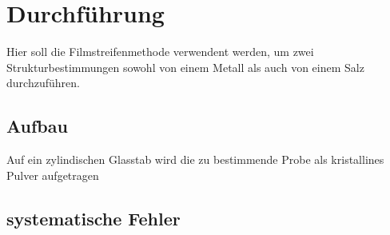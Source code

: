 \section{Durchführung}
\label{sec:Durchführung}
Hier soll die Filmstreifenmethode verwendent werden,
um zwei Strukturbestimmungen
sowohl von einem Metall als auch von
einem Salz durchzuführen.
\subsection{Aufbau}
\label{subsec:Aufbau}
Auf ein zylindischen Glasstab
wird die zu bestimmende Probe als
kristallines Pulver aufgetragen 
\subsection{systematische Fehler}
